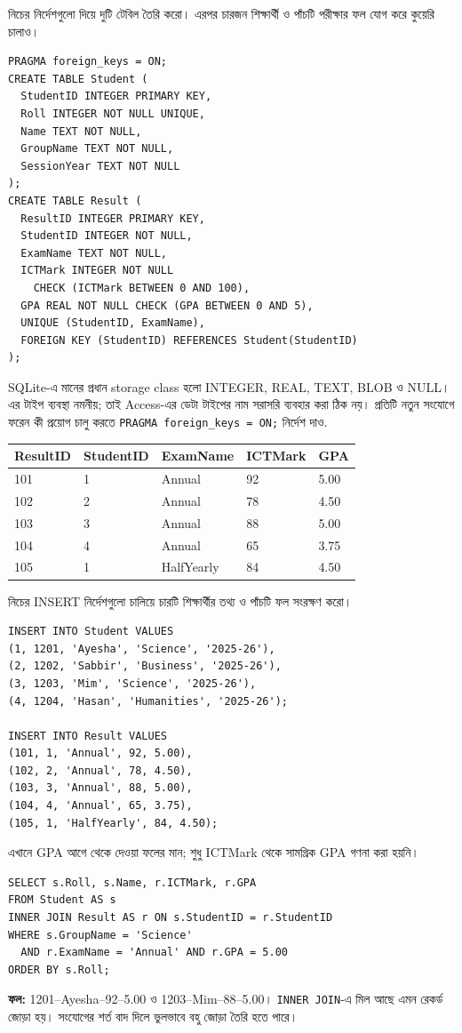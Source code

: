 নিচের নির্দেশগুলো দিয়ে দুটি টেবিল তৈরি করো। এরপর চারজন শিক্ষার্থী ও পাঁচটি পরীক্ষার ফল যোগ করে কুয়েরি চালাও।
\begin{verbatim}
PRAGMA foreign_keys = ON;
CREATE TABLE Student (
  StudentID INTEGER PRIMARY KEY,
  Roll INTEGER NOT NULL UNIQUE,
  Name TEXT NOT NULL,
  GroupName TEXT NOT NULL,
  SessionYear TEXT NOT NULL
);
CREATE TABLE Result (
  ResultID INTEGER PRIMARY KEY,
  StudentID INTEGER NOT NULL,
  ExamName TEXT NOT NULL,
  ICTMark INTEGER NOT NULL
    CHECK (ICTMark BETWEEN 0 AND 100),
  GPA REAL NOT NULL CHECK (GPA BETWEEN 0 AND 5),
  UNIQUE (StudentID, ExamName),
  FOREIGN KEY (StudentID) REFERENCES Student(StudentID)
);
\end{verbatim}
SQLite-এ মানের প্রধান storage class হলো INTEGER, REAL, TEXT, BLOB ও NULL। এর টাইপ ব্যবস্থা নমনীয়; তাই Access-এর ডেটা টাইপের নাম সরাসরি ব্যবহার করা ঠিক নয়। প্রতিটি নতুন সংযোগে ফরেন কী প্রয়োগ চালু করতে \texttt{PRAGMA foreign\_keys = ON;} নির্দেশ দাও.

\begin{flushleft}
\small
\begin{tabular}{|l|l|l|l|l|}\hline
ResultID & StudentID & ExamName & ICTMark & GPA\\ \hline
101 & 1 & Annual & 92 & 5.00\\\hline
102 & 2 & Annual & 78 & 4.50\\\hline
103 & 3 & Annual & 88 & 5.00\\\hline
104 & 4 & Annual & 65 & 3.75\\\hline
105 & 1 & HalfYearly & 84 & 4.50\\ \hline
\end{tabular}
\end{flushleft}
নিচের INSERT নির্দেশগুলো চালিয়ে চারটি শিক্ষার্থীর তথ্য ও পাঁচটি ফল সংরক্ষণ করো।
\begin{verbatim}
INSERT INTO Student VALUES
(1, 1201, 'Ayesha', 'Science', '2025-26'),
(2, 1202, 'Sabbir', 'Business', '2025-26'),
(3, 1203, 'Mim', 'Science', '2025-26'),
(4, 1204, 'Hasan', 'Humanities', '2025-26');

INSERT INTO Result VALUES
(101, 1, 'Annual', 92, 5.00),
(102, 2, 'Annual', 78, 4.50),
(103, 3, 'Annual', 88, 5.00),
(104, 4, 'Annual', 65, 3.75),
(105, 1, 'HalfYearly', 84, 4.50);
\end{verbatim}
 এখানে GPA আগে থেকে দেওয়া ফলের মান; শুধু ICTMark থেকে সামগ্রিক GPA গণনা করা হয়নি।
\begin{verbatim}
SELECT s.Roll, s.Name, r.ICTMark, r.GPA
FROM Student AS s
INNER JOIN Result AS r ON s.StudentID = r.StudentID
WHERE s.GroupName = 'Science'
  AND r.ExamName = 'Annual' AND r.GPA = 5.00
ORDER BY s.Roll;
\end{verbatim}
\textbf{ফল:} 1201--Ayesha--92--5.00 ও 1203--Mim--88--5.00। \texttt{INNER JOIN}-এ মিল আছে এমন রেকর্ড জোড়া হয়। সংযোগের শর্ত বাদ দিলে ভুলভাবে বহু জোড়া তৈরি হতে পারে।

